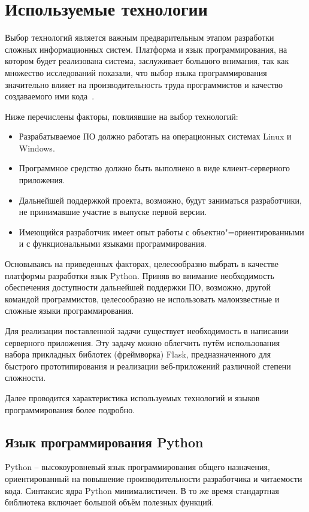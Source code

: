 \section{Используемые технологии}
\label{sec:techs:intro}

Выбор технологий является важным предварительным этапом разработки сложных информационных систем.
Платформа и язык программирования, на котором будет реализована система, заслуживает большого внимания, так как множество исследований показали, что выбор языка программирования значительно влияет на производительность труда программистов и качество создаваемого ими кода~\cite[c.~59]{mcconnell_2005}.

Ниже перечислены факторы, повлиявшие на выбор технологий:
\begin{itemize}
\item Разрабатываемое ПО должно работать на операционных системах Linux и Windows.
\item Программное средство должно быть выполнено в виде клиент-серверного приложения.
\item Дальнейшей поддержкой проекта, возможно, будут заниматься разработчики, не принимавшие участие в выпуске первой версии.
\item Имеющийся разработчик имеет опыт работы с объектно"=ориентированными и с функциональными языками программирования.
\end{itemize}

Основываясь на приведенных факторах, целесообразно выбрать в качестве платформы разработки язык Python. Приняв во внимание необходимость обеспечения доступности дальнейшей поддержки ПО, возможно, другой командой программистов, целесообразно не использовать малоизвестные и сложные языки программирования.

Для реализации поставленной задачи существует необходимость в написании серверного приложения. Эту задачу можно облегчить путём использования набора прикладных библотек (фреймворка) Flask, предназначенного для быстрого прототипирования и реализации веб-приложений различной степени сложности.

Далее проводится характеристика используемых технологий и языков программирования более подробно.



\subsection{Язык программирования Python}
\label{sub:techs:python}
Python -- высокоуровневый язык программирования общего назначения, ориентированный на повышение производительности разработчика и читаемости кода. Синтаксис ядра Python минималистичен. В то же время стандартная библиотека включает большой объём полезных функций.

